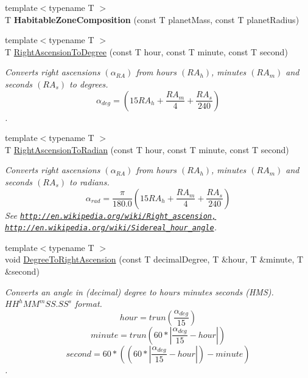 \begin{DoxyCompactItemize}
{\footnotesize template$<$typename T $>$ }\\T {\bfseries Habitable\+Zone\+Composition} (const T planet\+Mass, const T planet\+Radius)
\item 
{\footnotesize template$<$typename T $>$ }\\T \mbox{\hyperlink{group___e_g_x_phys-_astrophysics-_right_ascension_ga27ba790eb8358535613d3b32f97d9e3a}{Right\+Ascension\+To\+Degree}} (const T hour, const T minute, const T second)
\begin{DoxyCompactList}\small\item\em Converts right ascensions $(\alpha_{RA})$ from hours $(RA_h)$, minutes $(RA_m)$ and seconds $(RA_s)$ to degrees. \[\alpha_{deg}=(15 RA_h + \frac{RA_m}{4} + \frac{RA_s}{240})\]. \end{DoxyCompactList}\item 
{\footnotesize template$<$typename T $>$ }\\T \mbox{\hyperlink{group___e_g_x_phys-_astrophysics-_right_ascension_ga63a3103990c95078443e39a5b487ab0d}{Right\+Ascension\+To\+Radian}} (const T hour, const T minute, const T second)
\begin{DoxyCompactList}\small\item\em Converts right ascensions $(\alpha_{RA})$ from hours $(RA_h)$, minutes $(RA_m)$ and seconds $(RA_s)$ to radians. \[\alpha_{rad}=\frac{\pi}{180.0}(15 RA_h + \frac{RA_m}{4} + \frac{RA_s}{240})\] See \href{http://en.wikipedia.org/wiki/Right_ascension,}{\tt http\+://en.\+wikipedia.\+org/wiki/\+Right\+\_\+ascension,} \href{http://en.wikipedia.org/wiki/Sidereal_hour_angle}{\tt http\+://en.\+wikipedia.\+org/wiki/\+Sidereal\+\_\+hour\+\_\+angle}. \end{DoxyCompactList}\item 
{\footnotesize template$<$typename T $>$ }\\void \mbox{\hyperlink{group___e_g_x_phys-_astrophysics-_right_ascension_ga6fdbd35a030d278f396496899a1c236f}{Degree\+To\+Right\+Ascension}} (const T decimal\+Degree, T \&hour, T \&minute, T \&second)
\begin{DoxyCompactList}\small\item\em Converts an angle in (decimal) degree to hours minutes seconds (H\+MS). ${HH}^{h}{MM}^{m}{SS.SS}^{s}$ format. \[hour=trun(\frac{\alpha_{deg}}{15})\] \[minute=trun(60 * |\frac{\alpha_{deg}}{15} - hour|)\] \[second=60 * ((60 * |\frac{\alpha_{deg}}{15} - hour|)-minute)\]. \end{DoxyCompactList}\item 

\end{DoxyCompactItemize}
